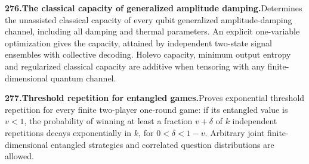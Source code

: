 \documentclass[11pt,a4paper]{article}
\begin{document}
  \par \begin{minipage}{\linewidth}
  \fontsize{10.5}{12.6}\selectfont\RaggedRight
  \hypertarget{result 276}{}
  {\bfseries\textcolor{muted}{276.}\enspace The classical capacity of generalized amplitude damping.}\enspace Determines the unassisted classical capacity of every qubit generalized amplitude-damping channel, including all damping and thermal parameters. An explicit one-variable optimization gives the capacity, attained by independent two-state signal ensembles with collective decoding. Holevo capacity, minimum output entropy and regularized classical capacity are additive when tensoring with any finite-dimensional quantum channel.\par
  \end{minipage}\par\vspace{5pt}



  \par \begin{minipage}{\linewidth}
  \fontsize{10.5}{12.6}\selectfont\RaggedRight
  \hypertarget{result 277}{}
  {\bfseries\textcolor{muted}{277.}\enspace Threshold repetition for entangled games.}\enspace Proves exponential threshold repetition for every finite two-player one-round game: if its entangled value is $v<1$, the probability of winning at least a fraction $v+\delta$ of $k$ independent repetitions decays exponentially in $k$, for $0<\delta<1-v$. Arbitrary joint finite-dimensional entangled strategies and correlated question distributions are allowed.\par
  \end{minipage}\par\vspace{5pt}
\end{document}
